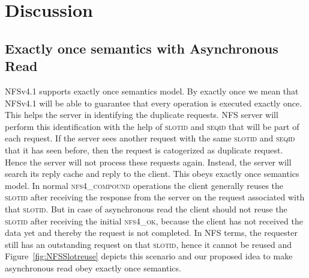 \section{Discussion}
\subsection{Exactly once semantics with Asynchronous Read}

	NFSv4.1 supports exactly once semantics model. By exactly once we mean that NFSv4.1 will be able to guarantee that every operation is executed exactly once. This helps the server in identifying the duplicate requests. NFS server will perform this identification with the help of \textsc{slotid} and \textsc{seqid} that will be part of each request. If the server sees another request with the same \textsc{slotid} and \textsc{seqid} that it has seen before, then the request is catogerized as duplicate request. Hence the server will not process these requests again. Instead, the server will search its reply cache and reply to the client. This obeys exactly once semantics model. In normal \textsc{nfs4\_compound} operations the client generally reuses the \textsc{slotid} after receiving the response from the server on the request associated with that \textsc{slotid}. But in case of asynchronous read the client should not reuse the \textsc{slotid} after receiving the initial \textsc{nfs4\_ok}, because the client has not received the data yet and thereby the request is not completed. In NFS terms, the requester still has an outstanding request on that \textsc{slotid}, hence it cannot be reused and Figure~\ref{fig:NFSSlotreuse} depicts this scenario and our proposed idea to make asynchronous read obey exactly once semantics.